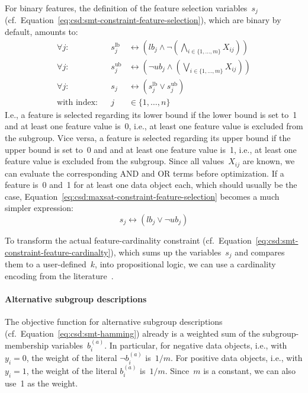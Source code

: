 \documentclass{article}
\theoremstyle{definition}
\begin{document}
For binary features, the definition of the feature selection variables~$s_j$ (cf.~Equation~\ref{eq:csd:smt-constraint-feature-selection}), which are binary by default, amounts to:
%
\begin{equation}
	\begin{aligned}
		\forall j: & & s^{\text{lb}}_j &\leftrightarrow \left( \mathit{lb}_j \land \lnot \left( \bigwedge_{i \in \{1, \dots, m\}} X_{ij} \right) \right) \\
		\forall j: & &s^{\text{ub}}_j &\leftrightarrow \left( \lnot \mathit{ub}_j \land \left( \bigvee_{i \in \{1, \dots, m\}} X_{ij} \right) \right) \\
		\forall j: & & s_j &\leftrightarrow \left( s^{\text{lb}}_j \lor s^{\text{ub}}_j \right) \\
		\text{with index:} & & j &\in \{1, \dots, n\}
	\end{aligned}
	\label{eq:csd:maxsat-constraint-feature-selection}
\end{equation}
%
I.e., a feature is selected regarding its lower bound if the lower bound is set to~1 and at least one feature value is~0, i.e., at least one feature value is excluded from the subgroup.
Vice versa, a feature is selected regarding its upper bound if the upper bound is set to~0 and and at least one feature value is~1, i.e., at least one feature value is excluded from the subgroup.
Since all values~$X_{ij}$ are known, we can evaluate the corresponding AND and OR terms before optimization.
If a feature is~0 and~1 for at least one data object each, which should usually be the case, Equation~\ref{eq:csd:maxsat-constraint-feature-selection} becomes a much simpler expression:
%
\begin{equation}
		s_j \leftrightarrow \left( \mathit{lb}_j\lor \lnot \mathit{ub}_j \right)
	\label{eq:csd:maxsat-constraint-feature-selections-simplified}
\end{equation}
%

To transform the actual feature-cardinality constraint (cf.~Equation~\ref{eq:csd:smt-constraint-feature-cardinalty}), which sums up the variables~$s_j$ and compares them to a user-defined~$k$, into propositional logic, we can use a cardinality encoding from the literature~\cite{sinz2005towards}.

\paragraph{Alternative subgroup descriptions}

The objective function for alternative subgroup descriptions (cf.~Equation~\ref{eq:csd:smt-hamming}) already is a weighted sum of the subgroup-membership variables~$b_i^{(a)}$.
In particular, for negative data objects, i.e., with $y_i = 0$, the weight of the literal $\lnot b_i^{(a)}$ is~$1 / m$.
For positive data objects, i.e., with $y_i = 1$, the weight of the literal $b_i^{(a)}$ is~$1 / m$.
Since~$m$ is a constant, we can also use~1 as the weight.
\end{document}
